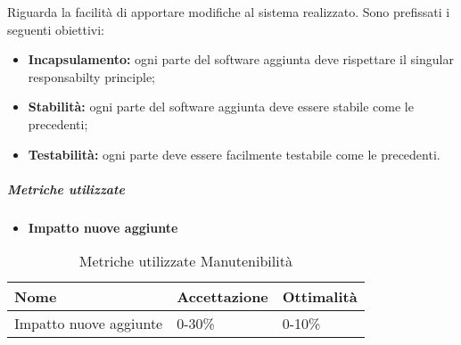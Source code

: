 Riguarda la facilità di apportare modifiche al sistema realizzato. Sono prefissati i seguenti obiettivi:
\begin{itemize}
	\item \textbf{Incapsulamento:} ogni parte del software aggiunta deve rispettare il singular responsabilty principle\pedice;
	\item \textbf{Stabilità:} ogni parte del software aggiunta deve essere stabile come le precedenti;
	\item \textbf{Testabilità:} ogni parte deve essere facilmente testabile come le precedenti.
\end{itemize}

\subparagraph{Metriche utilizzate}
\begin{itemize}
	\item \textbf{Impatto nuove aggiunte}
\end{itemize}
\begin{table}[H]
	\centering
	\renewcommand{\arraystretch}{2} 
		\begin{tabular}{|l|l|l|}
			\rowcolor{orange!50}
			\hline
			\textbf{Nome} & \textbf{Accettazione} & \textbf{Ottimalità} \\ \hline
			Impatto nuove aggiunte        &           0-30\%            &      0-10\%         \\ \hline                       
		\end{tabular}
	\caption{Metriche utilizzate Manutenibilità}
\end{table}
\clearpage

